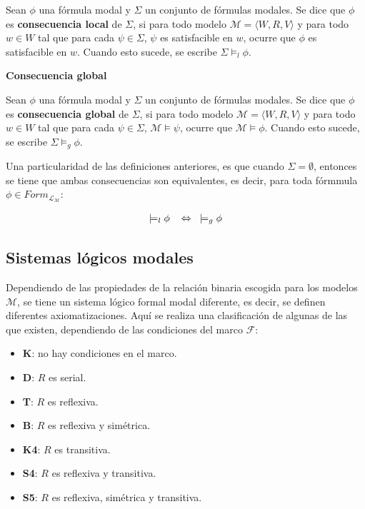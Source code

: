 Sean $\phi$ una fórmula modal y $\Sigma$ un conjunto de fórmulas modales. Se dice que $\phi$ es \textbf{consecuencia local} de $\Sigma$, si para todo modelo $\mathcal{M} = \langle W,R,V \rangle$ y para todo $w \in W$ tal que para cada $\psi \in \Sigma$, $\psi$ es satisfacible en $w$, ocurre que $\phi$ es satisfacible en $w$. Cuando esto sucede, se escribe $\Sigma \models_l \phi$.

\vspace{0.5cm}
\noindent
\textbf{Consecuencia global}

Sean $\phi$ una fórmula modal y $\Sigma$ un conjunto de fórmulas modales. Se dice que $\phi$ es \textbf{consecuencia global} de $\Sigma$, si para todo modelo $\mathcal{M} = \langle W,R,V \rangle$ y para todo $w \in W$ tal que para cada $\psi \in \Sigma$, $\mathcal{M} \models \psi$, ocurre que $\mathcal{M} \models \phi$. Cuando esto sucede, se escribe $\Sigma \models_g \phi$.

\vspace{0.5cm}
Una particularidad de las definiciones anteriores, es que cuando $\Sigma = \emptyset$, entonces se tiene que ambas consecuencias son equivalentes, es decir, para toda fórmmula $\phi \in Form_{\mathcal{L}_{\mathcal{M}}}$:

\begin{align*}
    \models_l \phi \hspace{0.3cm} \Leftrightarrow \hspace{0.3cm} \models_g \phi
\end{align*}

\subsection{Sistemas lógicos modales}\label{subsection:lmodalsystems}
Dependiendo de las propiedades de la relación binaria escogida para los modelos $\mathcal{M}$, se tiene un sistema lógico formal modal diferente, es decir, se definen diferentes axiomatizaciones. Aquí se realiza una clasificación de algunas de las que existen, dependiendo de las condiciones del marco $\mathcal{F}$:

\begin{itemize}
    \item \textbf{K}: no hay condiciones en el marco.
    \item \textbf{D}: $R$ es serial.
    \item \textbf{T}: $R$ es reflexiva.
    \item \textbf{B}: $R$ es reflexiva y simétrica.
    \item \textbf{K4}: $R$ es transitiva.
    \item \textbf{S4}: $R$ es reflexiva y transitiva.
    \item \textbf{S5}: $R$ es reflexiva, simétrica y transitiva.
\end{itemize}

